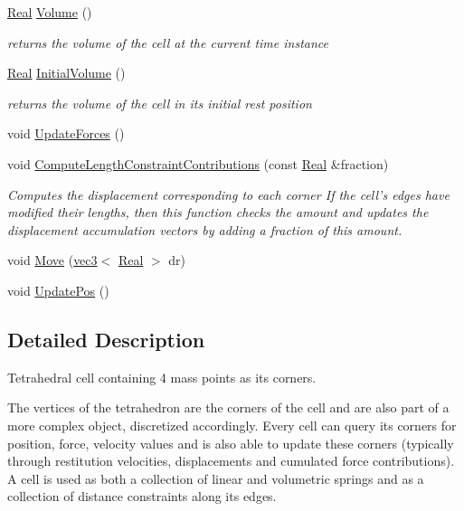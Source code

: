 \begin{DoxyCompactItemize}
\hyperlink{stdafx_8h_a445a5f0e2a34c9d97d69a3c2d1957907}{Real} \hyperlink{class_filum_1_1_tet_cell_ad321a8e0feb9d0c4c2fef2590cdb7636}{Volume} ()
\begin{DoxyCompactList}\small\item\em returns the volume of the cell at the current time instance \end{DoxyCompactList}\item 
\hyperlink{stdafx_8h_a445a5f0e2a34c9d97d69a3c2d1957907}{Real} \hyperlink{class_filum_1_1_tet_cell_aa604260d47322d3d7792edc1ddb09fd1}{Initial\-Volume} ()
\begin{DoxyCompactList}\small\item\em returns the volume of the cell in its initial rest position \end{DoxyCompactList}\item 
void \hyperlink{class_filum_1_1_tet_cell_acc6c3810bc543e0523e222d7df2250a4}{Update\-Forces} ()
\item 
void \hyperlink{class_filum_1_1_tet_cell_ab58963fdc09424fa07bdfae1718056e1}{Compute\-Length\-Constraint\-Contributions} (const \hyperlink{stdafx_8h_a445a5f0e2a34c9d97d69a3c2d1957907}{Real} \&fraction)
\begin{DoxyCompactList}\small\item\em Computes the displacement corresponding to each corner If the cell's edges have modified their lengths, then this function checks the amount and updates the displacement accumulation vectors by adding a fraction of this amount. \end{DoxyCompactList}\item 
void \hyperlink{class_filum_1_1_tet_cell_ab4c0cd0c58f3e0e4697eebeb88edd15b}{Move} (\hyperlink{structvmath_1_1vec3}{vec3}$<$ \hyperlink{stdafx_8h_a445a5f0e2a34c9d97d69a3c2d1957907}{Real} $>$ dr)
\item 
void \hyperlink{class_filum_1_1_tet_cell_af7fe75a09587ceb2ae7b000cd5706fc9}{Update\-Pos} ()
\end{DoxyCompactItemize}


\subsection{Detailed Description}
Tetrahedral cell containing 4 mass points as its corners. 

The vertices of the tetrahedron are the corners of the cell and are also part of a more complex object, discretized accordingly. Every cell can query its corners for position, force, velocity values and is also able to update these corners (typically through restitution velocities, displacements and cumulated force contributions). A cell is used as both a collection of linear and volumetric springs and as a collection of distance constraints along its edges. 

